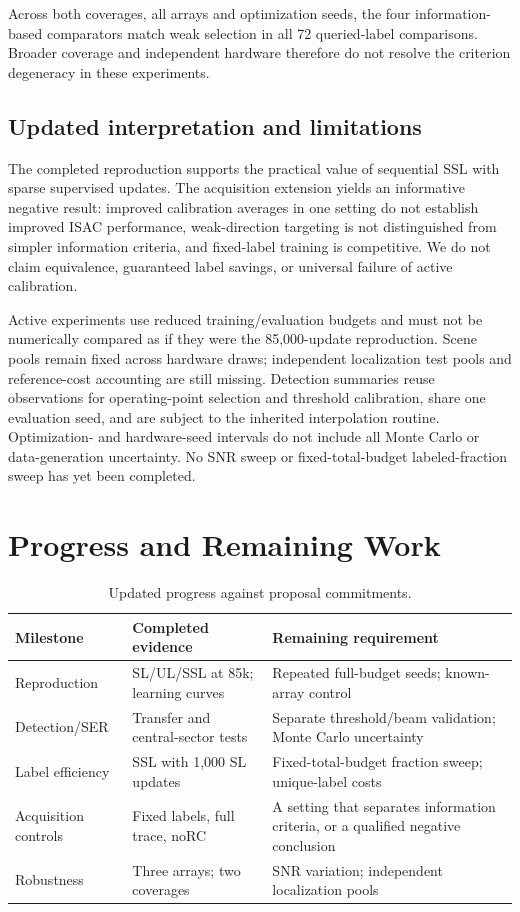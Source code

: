 \documentclass[conference]{IEEEtran}
\begin{document}
Across both coverages, all arrays and optimization seeds, the four information-based comparators match weak selection in all 72 queried-label comparisons. Broader coverage and independent hardware therefore do not resolve the criterion degeneracy in these experiments.

\subsection{Updated interpretation and limitations}
The completed reproduction supports the practical value of sequential SSL with sparse supervised updates. The acquisition extension yields an informative negative result: improved calibration averages in one setting do not establish improved ISAC performance, weak-direction targeting is not distinguished from simpler information criteria, and fixed-label training is competitive. We do not claim equivalence, guaranteed label savings, or universal failure of active calibration.

Active experiments use reduced training/evaluation budgets and must not be numerically compared as if they were the 85,000-update reproduction. Scene pools remain fixed across hardware draws; independent localization test pools and reference-cost accounting are still missing. Detection summaries reuse observations for operating-point selection and threshold calibration, share one evaluation seed, and are subject to the inherited interpolation routine. Optimization- and hardware-seed intervals do not include all Monte Carlo or data-generation uncertainty. No SNR sweep or fixed-total-budget labeled-fraction sweep has yet been completed.


\section{Progress and Remaining Work}
\begin{table}[t]\centering\small
\caption{Updated progress against proposal commitments.}\label{tab:progress}
\begin{tabularx}{\columnwidth}{lYY}\toprule
Milestone & Completed evidence & Remaining requirement\\\midrule
Reproduction & SL/UL/SSL at 85k; learning curves & Repeated full-budget seeds; known-array control\\
Detection/SER & Transfer and central-sector tests & Separate threshold/beam validation; Monte Carlo uncertainty\\
Label efficiency & SSL with 1,000 SL updates & Fixed-total-budget fraction sweep; unique-label costs\\
Acquisition controls & Fixed labels, full trace, noRC & A setting that separates information criteria, or a qualified negative conclusion\\
Robustness & Three arrays; two coverages & SNR variation; independent localization pools\\\bottomrule
\end{tabularx}\end{table}
\end{document}
